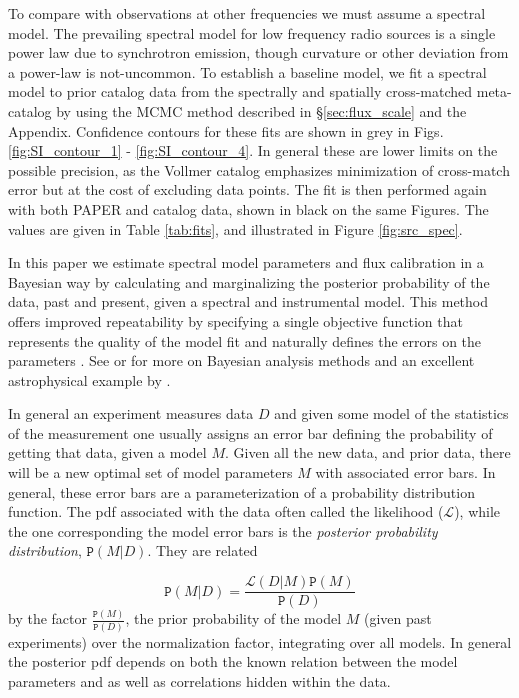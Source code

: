 \documentclass[preprint]{aastex}
\newcommand{\Prob}{\mathtt{P}}
\begin{document}
To compare with observations at other frequencies we must assume a spectral
model. The prevailing spectral model for low frequency radio sources is a
single power law due to synchrotron emission, though curvature or other
deviation from a power-law is not-uncommon.   To establish a baseline model, we
fit a spectral model to prior catalog data from the spectrally and spatially
cross-matched meta-catalog by \citet{Vollmer:2010p6422} using the MCMC method
described in \S \ref{sec:flux_scale} and the Appendix. Confidence contours for
these fits are shown in grey in Figs. \ref{fig:SI_contour_1} -
\ref{fig:SI_contour_4}.  In general these are lower limits on the possible
precision, as the Vollmer catalog emphasizes minimization of cross-match error
but at the cost of excluding data points.  The fit is then performed again with
both PAPER and catalog data, shown in black on the same Figures. The values are
given in Table \ref{tab:fits}, and
illustrated in Figure \ref{fig:src_spec}.  

In this paper we estimate spectral model parameters and flux calibration in a
Bayesian way by calculating and marginalizing the posterior probability of the
data, past and present, given a spectral and instrumental model.   This method
offers improved repeatability by specifying a single objective function that
represents the quality of the model fit and naturally defines the errors on the
parameters \citep{Hogg:2010p8759}.   See  \citet{Mackay:2003p9717}  or
\citet{Sivia:2006p9736} for more on Bayesian analysis methods and an excellent
astrophysical example by \cite{Press:1997p9783}.

In general an experiment measures data $D$ and given some model of the
statistics of the measurement one usually assigns an error bar defining the
probability of getting that data, given a model $M$.  Given all the new data,
and prior data, there will be a new optimal set of model parameters $M$ with
associated error bars.  In general, these error bars are a parameterization of
a probability distribution function.  The pdf associated with the data often
called the likelihood ($\mathcal{L}$), while the one corresponding the model
error bars is the {\em posterior probability distribution}, $\Prob(M|D)$. They
are related

\[
\Prob(M|D) = \frac{\mathcal{L}(D|M) \Prob(M)}{\Prob(D)}
\] 
by the factor $\frac{\Prob(M)}{\Prob(D)}$, the prior probability of the model
$M$ (given past experiments) over the normalization factor, integrating over
all models.  In general the posterior pdf depends on both the known relation
between the model parameters and as well as correlations hidden within the
data.  
\end{document}
